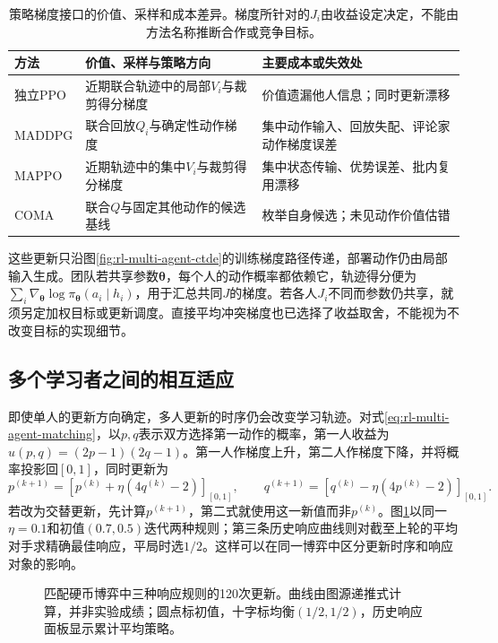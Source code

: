\begin{table}[htbp]
 \centering
 \begin{tabularx}{\linewidth}{@{}l >{\raggedright\arraybackslash}X >{\raggedright\arraybackslash}X@{}}
 \toprule
 方法 & 价值、采样与策略方向 & 主要成本或失效处\\
 \midrule
 独立PPO & 近期联合轨迹中的局部$V_i$与裁剪得分梯度 & 价值遗漏他人信息；同时更新漂移\\
 MADDPG & 联合回放$Q_i$与确定性动作梯度 & 集中动作输入、回放失配、评论家动作梯度误差\\
 MAPPO & 近期轨迹中的集中$V_i$与裁剪得分梯度 & 集中状态传输、优势误差、批内复用漂移\\
 COMA & 联合$Q$与固定其他动作的候选基线 & 枚举自身候选；未见动作价值估错\\
 \bottomrule
 \end{tabularx}
 \caption{策略梯度接口的价值、采样和成本差异。梯度所针对的$J_i$由收益设定决定，不能由方法名称推断合作或竞争目标。}
 \label{tab:rl-multi-agent-policy-updates}
\end{table}

这些更新只沿图\ref{fig:rl-multi-agent-ctde}的训练梯度路径传递，部署动作仍由局部输入生成。团队若共享参数$\bm\theta$，每个人的动作概率都依赖它，轨迹得分便为$\sum_i\nabla_{\bm\theta}\log\pi_{\bm\theta}(a_i\mid h_i)$，用于汇总共同$J$的梯度。若各人$J_i$不同而参数仍共享，就须另定加权目标或更新调度。直接平均冲突梯度也已选择了收益取舍，不能视为不改变目标的实现细节。

\subsection{多个学习者之间的相互适应}
\label{sec:rl-multi-agent-mutual-learning}

即使单人的更新方向确定，多人更新的时序仍会改变学习轨迹。对式\eqref{eq:rl-multi-agent-matching}，以$p,q$表示双方选择第一动作的概率，第一人收益为$u(p,q)=(2p-1)(2q-1)$。第一人作梯度上升，第二人作梯度下降，并将概率投影回$[0,1]$，同时更新为
\[
 p^{(k+1)}=[p^{(k)}+\eta(4q^{(k)}-2)]_{[0,1]},\qquad
 q^{(k+1)}=[q^{(k)}-\eta(4p^{(k)}-2)]_{[0,1]}.
\]
若改为交替更新，先计算$p^{(k+1)}$，第二式就使用这一新值而非$p^{(k)}$。图\ref{fig:rl-multi-agent-trajectories}以同一$\eta=0.1$和初值$(0.7,0.5)$迭代两种规则；第三条历史响应曲线则对截至上轮的平均对手求精确最佳响应，平局时选$1/2$。这样可以在同一博弈中区分更新时序和响应对象的影响。

\begin{figure}[htbp]
 \centering
 
 \caption{匹配硬币博弈中三种响应规则的120次更新。曲线由图源递推式计算，并非实验成绩；圆点标初值，十字标均衡$(1/2,1/2)$，历史响应面板显示累计平均策略。}
 \label{fig:rl-multi-agent-trajectories}
\end{figure}

